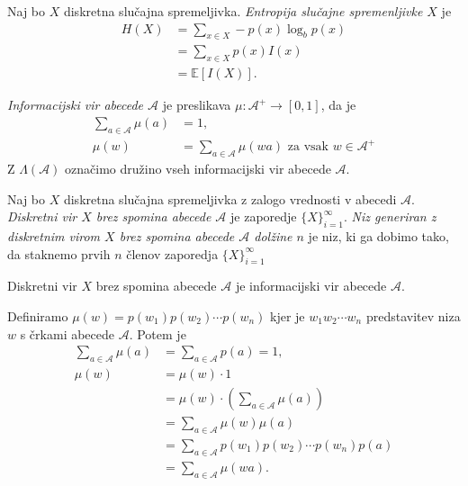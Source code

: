 \documentclass[fin1, tisk]{fmfdelo}
\newcommand{\E}{\mathbb{E}}
\newcommand{\A}{\mathcal{A}}
\theoremstyle{definition}
\begin{document}
\begin{definicija}
    Naj bo $X$ diskretna slučajna spremeljivka. \emph{Entropija slučajne spremenljivke $X$} je
    \begin{align*}
        H(X) &= \sum_{x \in X} - p(x) \log_b p(x) \\
             &= \sum_{x \in X} p(x) I(x) \\
             &= \E[I(X)].
    \end{align*}
\end{definicija}

\begin{definicija}
    \emph{Informacijski vir abecede $\A$} je preslikava $\mu \colon \A^+ \to [0,1]$, da je 
    \begin{align*}
        \sum_{a \in \A} \mu(a) &= 1, \\
        \mu(w) &= \sum_{a \in \A} \mu(wa) \text{ za vsak } w \in \A^+
    \end{align*}
    Z $\Lambda(\A)$ označimo družino vseh informacijski vir abecede $\A$.
\end{definicija}

\begin{definicija} %
    Naj bo $X$ diskretna slučajna spremeljivka z zalogo vrednosti v abecedi $\A$.
    \emph{Diskretni vir $X$ brez spomina abecede $\A$} je zaporedje $\{ X \}_{i=1}^{\infty}$.
    \emph{Niz generiran z diskretnim virom $X$ brez spomina abecede $\A$ dolžine $n$} je niz, ki 
    ga dobimo tako, da staknemo prvih $n$ členov zaporedja $\{ X \}_{i=1}^{\infty}$
\end{definicija}

\begin{trditev}
    Diskretni vir $X$ brez spomina abecede $\A$ je informacijski vir abecede $\A$.
\end{trditev}

\begin{dokaz}
    Definiramo $\mu(w) = p(w_1)p(w_2) \cdots p(w_n)$ kjer je $w_1w_2 \cdots w_n$ predstavitev niza
    $w$ s črkami abecede $\A$. Potem je
    \begin{align*}
        \sum_{a \in \A} \mu(a) &= \sum_{a \in \A} p(a) = 1, \\
        \mu(w) &= \mu(w) \cdot 1 \\
        &= \mu(w) \cdot \left( \sum_{a \in \A} \mu(a) \right) \\
        &= \sum_{a \in \A} \mu(w)\mu(a) \\
        &= \sum_{a \in \A} p(w_1) p(w_2) \cdots p(w_n) p(a) \\
        &= \sum_{a \in \A} \mu(wa).
    \end{align*}
\end{dokaz}
\end{document}
